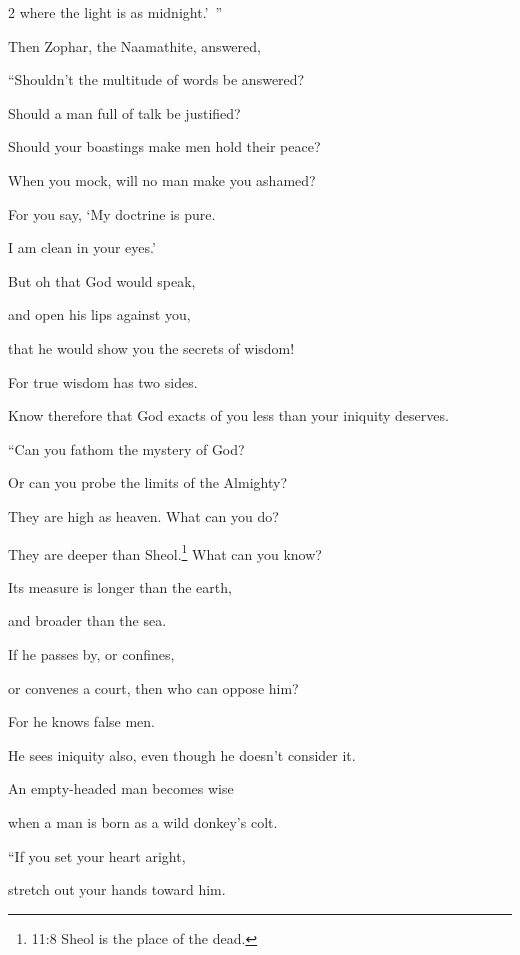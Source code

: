 \begin{multicols}{2}
	where the light is as midnight.’ ”
	
	
	\mychapter{} \myverse*{}Then Zophar, the Naamathite, answered,
	
	\myverse{}“Shouldn’t the multitude of words be answered?
	
	Should a man full of talk be justified?
	
	\myverse{}Should your boastings make men hold their peace?
	
	When you mock, will no man make you ashamed?
	
	\myverse{}For you say, ‘My doctrine is pure.
	
	I am clean in your eyes.’
	
	\myverse{}But oh that God would speak,
	
	and open his lips against you,
	
	\myverse{}that he would show you the secrets of wisdom!
	
	For true wisdom has two sides.
	
	Know therefore that God exacts of you less than your iniquity deserves.
	
	\vspace{\baselineskip}
	
	\myverse{}“Can you fathom the mystery of God?
	
	Or can you probe the limits of the Almighty?
	
	\myverse{}They are high as heaven. What can you do?
	
	They are deeper than Sheol.\footnote{11:8 Sheol is the place of the dead.} What can you know?
	
	\myverse{}Its measure is longer than the earth,
	
	and broader than the sea.
	
	\myverse{}If he passes by, or confines,
	
	or convenes a court, then who can oppose him?
	
	\myverse{}For he knows false men.
	
	He sees iniquity also, even though he doesn’t consider it.
	
	\myverse{}An empty-headed man becomes wise
	
	when a man is born as a wild donkey’s colt.
	
	\vspace{\baselineskip}
	
	\myverse{}“If you set your heart aright,
	
	stretch out your hands toward him.
	

\end{multicols}
